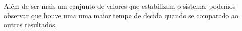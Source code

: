 Além de ser mais um conjunto de valores que estabilizam o sistema, podemos observar que houve uma uma maior tempo de decida quando se comparado
ao outros resultados.